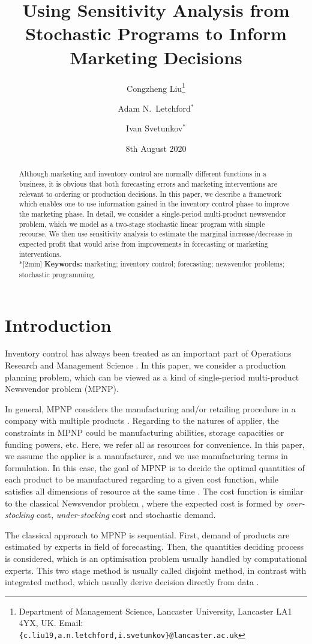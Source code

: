 \documentclass[a4paper,11pt]{article}
\title{Using Sensitivity Analysis from Stochastic Programs to Inform Marketing Decisions}
\author{Congzheng Liu\thanks{Department of Management Science,
Lancaster University, Lancaster LA1 4YX, UK.
Email: {\tt \{c.liu19,a.n.letchford,i.svetunkov\}@lancaster.ac.uk}}
\and Adam N.\ Letchford$^*$ \and Ivan Svetunkov$^*$} %
\date{8th August 2020}
\begin{document}
\maketitle

\begin{abstract}
Although marketing and inventory control are normally different functions in a business, it is obvious that both forecasting errors and marketing interventions are relevant to ordering or production decisions. In this paper, we describe a framework which enables one to use information gained in the inventory control phase to improve the marketing phase. In detail, we consider a single-period multi-product newsvendor problem, which we model as a two-stage stochastic linear program with simple recourse. We then use sensitivity analysis to estimate the marginal increase/decrease in expected profit that would arise from improvements in forecasting or marketing interventions.
\\*[2mm]
{\bf Keywords:} marketing; inventory control; forecasting; newsvendor problems; stochastic programming
\end{abstract}

\section{Introduction}
Inventory control has always been treated as an important part of Operations Research and Management Science \cite{Po02,SPP98,Zi00}. In this paper, we consider a production planning problem, which can be viewed as a kind of single-period multi-product
Newsvendor problem (MPNP)\cite{D98,TTV12}.

In general, MPNP considers the manufacturing and/or retailing procedure in a company with multiple products \cite{SPP98}. Regarding to the natures of applier, the constraints in MPNP could be manufacturing abilities, storage capacities or funding powers, etc. Here, we refer all as resources for convenience. In this paper, we assume the applier is a manufacturer, and we use manufacturing terms in formulation. In this case, the goal of MPNP is to decide the optimal quantities of each product to be manufactured regarding to a given cost function, while satisfies all dimensions of resource at the same time \cite{BDR12}. The cost function is similar to the classical Newsvendor problem \cite{Ch12}, where the expected cost is formed by \emph{over-stocking} cost, \emph{under-stocking} cost and stochastic demand.

The classical approach to MPNP is sequential. First, demand of products are estimated by experts in field of forecasting. Then, the quantities deciding process is considered, which is an optimisation problem usually handled by computational experts. This two stage method is usually called disjoint method, in contrast with integrated method, which usually derive decision directly from data \cite{Sc58}. 
\end{document}
